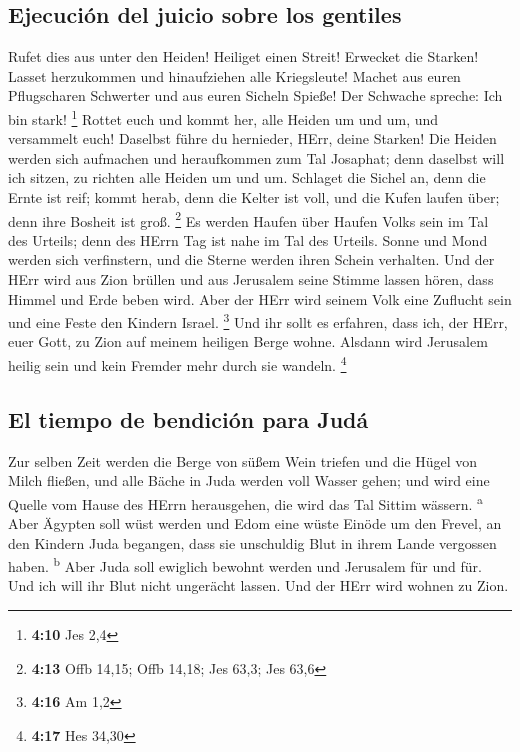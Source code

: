 \hypertarget{ejecuciuxf3n-del-juicio-sobre-los-gentiles}{%
\subsection{Ejecución del juicio sobre los
gentiles}\label{ejecuciuxf3n-del-juicio-sobre-los-gentiles}}

 Rufet dies aus unter den Heiden! Heiliget einen Streit!
Erwecket die Starken! Lasset herzukommen und hinaufziehen alle
Kriegsleute!  Machet aus euren Pflugscharen Schwerter und
aus euren Sicheln Spieße! Der Schwache spreche: Ich bin stark!
\footnote{\textbf{4:10} Jes 2,4}  Rottet euch und kommt
her, alle Heiden um und um, und versammelt euch! Daselbst führe du
hernieder, HErr, deine Starken!  Die Heiden werden sich
aufmachen und heraufkommen zum Tal Josaphat; denn daselbst will ich
sitzen, zu richten alle Heiden um und um.  Schlaget die
Sichel an, denn die Ernte ist reif; kommt herab, denn die Kelter ist
voll, und die Kufen laufen über; denn ihre Bosheit ist groß. \footnote{\textbf{4:13}
  Offb 14,15; Offb 14,18; Jes 63,3; Jes 63,6}  Es werden
Haufen über Haufen Volks sein im Tal des Urteils; denn des HErrn Tag ist
nahe im Tal des Urteils.  Sonne und Mond werden sich
verfinstern, und die Sterne werden ihren Schein verhalten.
 Und der HErr wird aus Zion brüllen und aus Jerusalem
seine Stimme lassen hören, dass Himmel und Erde beben wird. Aber der
HErr wird seinem Volk eine Zuflucht sein und eine Feste den Kindern
Israel. \footnote{\textbf{4:16} Am 1,2}  Und ihr sollt es
erfahren, dass ich, der HErr, euer Gott, zu Zion auf meinem heiligen
Berge wohne. Alsdann wird Jerusalem heilig sein und kein Fremder mehr
durch sie wandeln. \footnote{\textbf{4:17} Hes 34,30}

\hypertarget{el-tiempo-de-bendiciuxf3n-para-juduxe1}{%
\subsection{El tiempo de bendición para
Judá}\label{el-tiempo-de-bendiciuxf3n-para-juduxe1}}

 Zur selben Zeit werden die Berge von süßem Wein triefen
und die Hügel von Milch fließen, und alle Bäche in Juda werden voll
Wasser gehen; und wird eine Quelle vom Hause des HErrn herausgehen, die
wird das Tal Sittim wässern. \textsuperscript{a}  Aber
Ägypten soll wüst werden und Edom eine wüste Einöde um den Frevel, an
den Kindern Juda begangen, dass sie unschuldig Blut in ihrem Lande
vergossen haben. \textsuperscript{b}  Aber Juda soll
ewiglich bewohnt werden und Jerusalem für und für.  Und
ich will ihr Blut nicht ungerächt lassen. Und der HErr wird wohnen zu
Zion.
